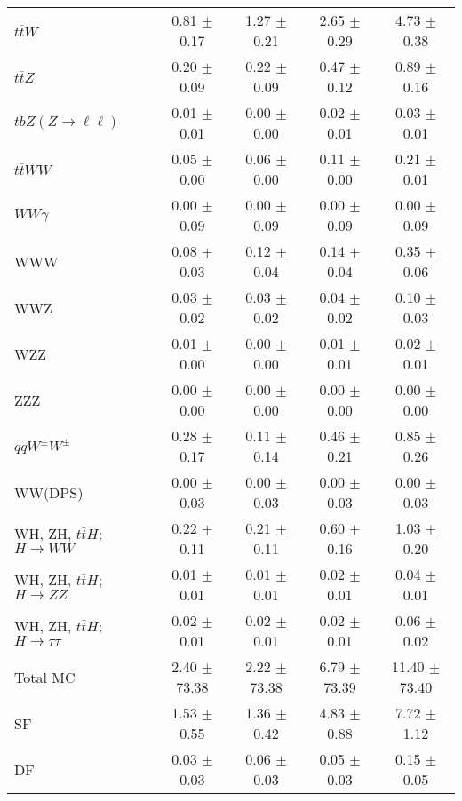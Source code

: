 \begin{tabular}{l|cccc}
                   $t\overline{t}W$ &  0.81 $\pm$  0.17 &  1.27 $\pm$  0.21 &  2.65 $\pm$  0.29 &  4.73 $\pm$  0.38 \\
                   $t\overline{t}Z$ &  0.20 $\pm$  0.09 &  0.22 $\pm$  0.09 &  0.47 $\pm$  0.12 &  0.89 $\pm$  0.16 \\
    $tbZ (Z \rightarrow \ell \ell)$ &  0.01 $\pm$  0.01 &  0.00 $\pm$  0.00 &  0.02 $\pm$  0.01 &  0.03 $\pm$  0.01 \\
                  $t\overline{t}WW$ &  0.05 $\pm$  0.00 &  0.06 $\pm$  0.00 &  0.11 $\pm$  0.00 &  0.21 $\pm$  0.01 \\
                         $WW\gamma$ &  0.00 $\pm$  0.09 &  0.00 $\pm$  0.09 &  0.00 $\pm$  0.09 &  0.00 $\pm$  0.09 \\
                                WWW &  0.08 $\pm$  0.03 &  0.12 $\pm$  0.04 &  0.14 $\pm$  0.04 &  0.35 $\pm$  0.06 \\
                                WWZ &  0.03 $\pm$  0.02 &  0.03 $\pm$  0.02 &  0.04 $\pm$  0.02 &  0.10 $\pm$  0.03 \\
                                WZZ &  0.01 $\pm$  0.00 &  0.00 $\pm$  0.00 &  0.01 $\pm$  0.01 &  0.02 $\pm$  0.01 \\
                                ZZZ &  0.00 $\pm$  0.00 &  0.00 $\pm$  0.00 &  0.00 $\pm$  0.00 &  0.00 $\pm$  0.00 \\
                 $qqW^{\pm}W^{\pm}$ &  0.28 $\pm$  0.17 &  0.11 $\pm$  0.14 &  0.46 $\pm$  0.21 &  0.85 $\pm$  0.26 \\
                            WW(DPS) &  0.00 $\pm$  0.03 &  0.00 $\pm$  0.03 &  0.00 $\pm$  0.03 &  0.00 $\pm$  0.03 \\
WH, ZH, $t\bar{t}H$; $H \rightarrow WW$ &  0.22 $\pm$  0.11 &  0.21 $\pm$  0.11 &  0.60 $\pm$  0.16 &  1.03 $\pm$  0.20 \\
WH, ZH, $t\bar{t}H$; $H \rightarrow ZZ$ &  0.01 $\pm$  0.01 &  0.01 $\pm$  0.01 &  0.02 $\pm$  0.01 &  0.04 $\pm$  0.01 \\
WH, ZH, $t\bar{t}H$; $H \rightarrow \tau\tau$ &  0.02 $\pm$  0.01 &  0.02 $\pm$  0.01 &  0.02 $\pm$  0.01 &  0.06 $\pm$  0.02 \\
\hline\hline
                           Total MC &  2.40 $\pm$ 73.38 &  2.22 $\pm$ 73.38 &  6.79 $\pm$ 73.39 & 11.40 $\pm$ 73.40 \\
\hline
                                 SF &  1.53 $\pm$  0.55 &  1.36 $\pm$  0.42 &  4.83 $\pm$  0.88 &  7.72 $\pm$  1.12 \\
                                 DF &  0.03 $\pm$  0.03 &  0.06 $\pm$  0.03 &  0.05 $\pm$  0.03 &  0.15 $\pm$  0.05 \\

\end{tabular}
